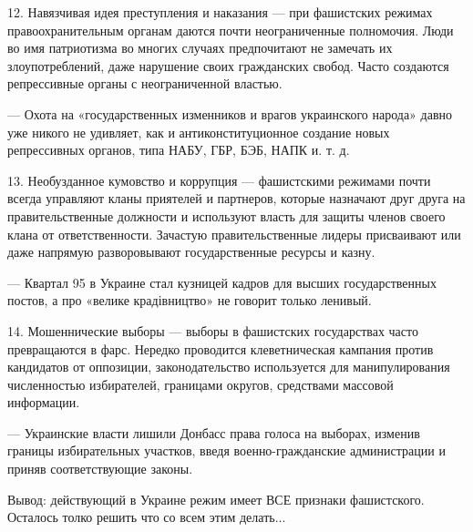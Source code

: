 12. Навязчивая идея преступления и наказания — при фашистских режимах
правоохранительным органам даются почти неограниченные полномочия. Люди во имя
патриотизма во многих случаях предпочитают не замечать их злоупотреблений, даже
нарушение своих гражданских свобод. Часто создаются репрессивные органы с
неограниченной властью.

— Охота на «государственных изменников и врагов украинского народа» давно уже
никого не удивляет, как и антиконституционное создание новых репрессивных
органов, типа НАБУ, ГБР, БЭБ, НАПК и. т. д.

13. Необузданное кумовство и коррупция — фашистскими режимами почти всегда
управляют кланы приятелей и партнеров, которые назначают друг друга на
правительственные должности и используют власть для защиты членов своего клана
от ответственности. Зачастую правительственные лидеры присваивают или даже
напрямую разворовывают государственные ресурсы и казну.

— Квартал 95 в Украине стал кузницей кадров для высших государственных постов,
а про «велике крадівництво» не говорит только ленивый. 

14. Мошеннические выборы — выборы в фашистских государствах часто превращаются
в фарс. Нередко проводится клеветническая кампания против кандидатов от
оппозиции, законодательство используется для манипулирования численностью
избирателей, границами округов, средствами массовой информации.

— Украинские власти лишили Донбасс права голоса на выборах, изменив границы
избирательных участков, введя военно-гражданские администрации и приняв
соответствующие законы.

Вывод: действующий в Украине режим имеет ВСЕ признаки фашистского. Осталось
толко решить что со всем этим делать...
